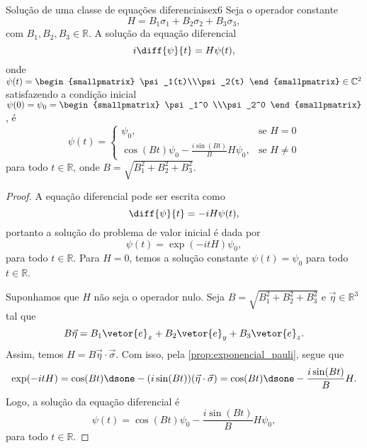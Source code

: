 \begin{proposition}{Solução de uma classe de equações diferenciais}{ex6}
    Seja o operador constante
    \begin{equation*}
        H = B_1 \sigma_1 + B_2 \sigma_2 + B_3 \sigma_3,
    \end{equation*}
    com \(B_1, B_2, B_3 \in \mathbb{R}\). A solução da equação diferencial
    \begin{equation*}
        i \diff{\psi}{t} = H\psi(t),
    \end{equation*}
    onde \(\psi(t) = \begin{smallpmatrix}
        \psi_1(t)\\\psi_2(t)
    \end{smallpmatrix}\in \mathbb{C}^2\) satisfazendo a condição inicial \(\psi(0) = \psi_0 = \begin{smallpmatrix}
       \psi_1^0 \\\psi_2^0
    \end{smallpmatrix}\), é
    \begin{equation*}
        \psi(t) = \begin{cases}
            \psi_0,&\text{se }H=0\\
            \cos(Bt) \psi_0 -\frac{i\sin(Bt)}{B} H\psi_0,&\text{se }H\neq0
        \end{cases}
    \end{equation*}
    para todo \(t \in \mathbb{R}\), onde \(B = \sqrt{B_1^2 + B_2^2 + B_3^2}\).
\end{proposition}
\begin{proof}
    A equação diferencial pode ser escrita como
    \begin{equation*}
        \diff{\psi}{t} = -i H\psi(t),
    \end{equation*}
    portanto a solução do problema de valor inicial é dada por
    \begin{equation*}
        \psi(t) = \exp(-it H)\psi_0,
    \end{equation*}
    para todo \(t \in \mathbb{R}\). Para \(H = 0\), temos a solução constante \(\psi(t) = \psi_0\) para todo \(t \in \mathbb{R}\).

    Suponhamos que \(H\) não seja o operador nulo. Seja \(B = \sqrt{B_1^2 + B_2^2 + B_3^2}\) e \(\vec \eta \in \mathbb{R}^3\) tal que
    \begin{equation*}
        B \vec \eta = B_1 \vetor{e}_x + B_2\vetor{e}_y + B_3 \vetor{e}_z.
    \end{equation*}
    Assim, temos \(H = B \vec \eta \cdot \vec \sigma\). Com isso, pela \cref{prop:exponencial_pauli}, segue que
    \begin{equation*}
        \exp(-itH) = \cos(Bt) \dsone - (i \sin(Bt)) (\vec \eta \cdot \vec \sigma) = \cos(Bt) \dsone - \frac{i\sin(Bt)}{B} H.
    \end{equation*}
    Logo, a solução da equação diferencial é
    \begin{equation*}
        \psi(t) = \cos(Bt) \psi_0 - \frac{i\sin(Bt)}{B}H\psi_0,
    \end{equation*}
    para todo \(t \in \mathbb{R}\).
\end{proof}
